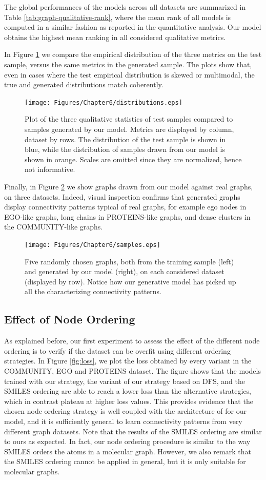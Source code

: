 The global performances of the models across all datasets are summarized in Table \ref{tab:graph-qualitative-rank}, where the mean rank of all models is computed in a similar fashion as reported in the quantitative analysis. Our model obtains the highest mean ranking in all considered qualitative metrics.

In Figure \ref{fig:distributions} we compare the empirical distribution of the three metrics on the test sample, versus the same metrics in the generated sample. The plots show that, even in cases where the test empirical distribution is skewed or multimodal, the true and generated distributions match coherently.
\begin{figure}[h!]
\centering
\texttt{[image: Figures/Chapter6/distributions.eps]}
\caption{Plot of the three qualitative statistics of test samples compared to samples generated by our model. Metrics are displayed by column, dataset by rows. The distribution of the test sample is shown in blue, while the distribution of samples drawn from our model is shown in orange. Scales are omitted since they are normalized, hence not informative.}
\label{fig:distributions}
\end{figure}
Finally, in Figure \ref{fig:samples} we show graphs drawn from our model against real graphs, on three datasets. Indeed, visual inspection confirms that generated graphs display connectivity patterns typical of real graphs, for example ego nodes in EGO-like graphs, long chains in PROTEINS-like graphs, and dense clusters in the COMMUNITY-like graphs.
\begin{figure}[h!]
\centering
\texttt{[image: Figures/Chapter6/samples.eps]}
\caption{Five randomly chosen graphs, both from the training sample (left) and generated by our model (right), on each considered dataset (displayed by row). Notice how our generative model has picked up all the characterizing connectivity patterns.}
\label{fig:samples}
\end{figure}

\subsection{Effect of Node Ordering}
As explained before, our first experiment to assess the effect of the different node ordering is to verify if the dataset can be overfit using different ordering strategies. In Figure \ref{fig:loss}, we plot the loss obtained by every variant in the COMMUNITY, EGO and PROTEINS dataset. The figure shows that the models trained with our strategy, the variant of our strategy based on DFS, and the SMILES ordering are able to reach a lower loss than the alternative strategies, which in contrast plateau at higher loss values. This provides evidence that the chosen node ordering strategy is well coupled with the architecture of for our model, and it is sufficiently general to learn connectivity patterns from very different graph datasets. Note that the results of the SMILES ordering are similar to ours as expected. In fact, our node ordering procedure is similar to the way SMILES orders the atoms in a molecular graph. However, we also remark that the SMILES ordering cannot be applied in general, but it is only suitable for molecular graphs.

